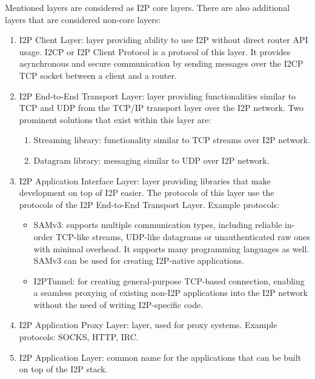 Mentioned layers are considered as I2P core layers. There are also additional layers that are considered non-core layers:
\begin{enumerate}
    \item I2P Client Layer: layer providing ability to use I2P without direct router API usage. I2CP or I2P Client Protocol is a protocol of this layer. It provides asynchronous and secure communication by sending messages over the I2CP TCP socket between a client and a router.
    \item I2P End-to-End Transport Layer: layer providing functionalities similar to TCP and UDP from the TCP/IP transport layer over the I2P network. Two prominent solutions that exist within this layer are:
    \begin{enumerate}
        \item Streaming library: functionality similar to  TCP streams over I2P network.
        \item Datagram library: messaging similar to UDP over I2P network.
    \end{enumerate}
    \item I2P Application Interface Layer: layer providing libraries that make development on top of I2P easier. The protocols of this layer use the protocols of the I2P End-to-End Transport Layer. Example protocols:
    \begin{itemize}
        \item SAMv3: supports multiple communication types, including reliable in-order TCP-like streams, UDP-like datagrams or unauthenticated raw ones with minimal overhead. It supports many programming languages as well. SAMv3 can be used for creating I2P-native applications.
        \item I2PTunnel: for creating general-purpose TCP-based connection, enabling a seamless proxying of existing non-I2P applications into the I2P network without the need of writing I2P-specific code.
    \end{itemize}
    \item I2P Application Proxy Layer: layer, used for proxy systems. Example protocols: SOCKS, HTTP, IRC.
    \item I2P Application Layer: common name for the applications that can be built on top of the I2P stack.
\end{enumerate}

